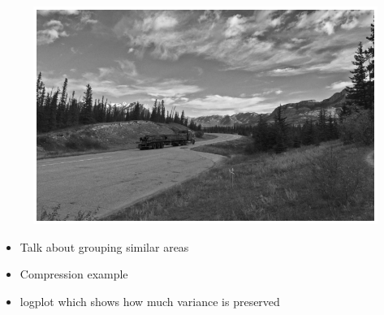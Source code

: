 \begin{center}
    \begin{figure}[h]
      \centering
      \includegraphics[width=0.94\linewidth]{external_content/media/compression_example/uncompressed.png}
      \captionsetup{justification=centering}
    \end{figure}
\end{center}

\begin{itemize}
  \item Talk about grouping similar areas
  \item Compression example
  \item logplot which shows how much variance is preserved
\end{itemize}
